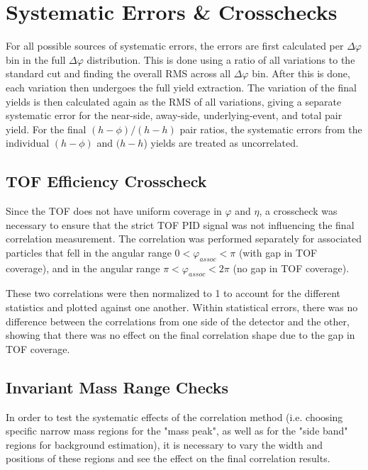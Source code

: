 \documentclass[ALICE,manyauthors]{ALICE_analysis_notes}
\begin{document}
\section{Systematic Errors \& Crosschecks}

For all possible sources of systematic errors, the errors are first calculated per $\Delta\varphi$ bin in the full $\Delta\varphi$ distribution.  This is done using a ratio of all variations to the standard cut and finding the overall RMS across all $\Delta\varphi$ bin. After this is done, each variation then undergoes the full yield extraction.  The variation of the final yields is then calculated again as the RMS of all variations, giving a separate systematic error for the near-side, away-side, underlying-event, and total pair yield.  For the final $(h-\phi)/(h-h)$ pair ratios, the systematic errors from the individual $(h-\phi)$ and $(h-h$) yields are treated as uncorrelated.

\subsection{TOF Efficiency Crosscheck}

Since the TOF does not have uniform coverage in $\varphi$ and $\eta$, a crosscheck was necessary to ensure that the strict TOF PID signal was not influencing the final correlation measurement.  The correlation was performed separately for associated particles that fell in the angular range $0 < \varphi_{assoc} < \pi$ (with gap in TOF coverage), and in the angular range $\pi < \varphi_{assoc} < 2\pi$ (no gap in TOF coverage).  

These two correlations were then normalized to 1 to account for the different statistics and plotted against one another.  Within statistical errors, there was no difference between the correlations from one side of the detector and the other, showing that there was no effect on the final correlation shape due to the gap in TOF coverage.

\subsection{Invariant Mass Range Checks}
\label{rangeselection}
In order to test the systematic effects of the correlation method (i.e. choosing specific narrow mass regions for the "mass peak", as well as for the "side band" regions for background estimation), it is necessary to vary the width and positions of these regions and see the effect on the final correlation results.
\end{document}
